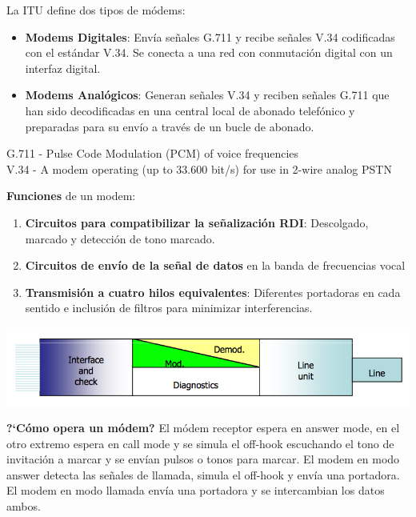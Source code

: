 \documentclass[10pt,portrait, twocolumn]{article}
\makeatletter
\renewcommand{\subsubsection}{\@startsection{subsubsection}{3}{0mm}%
                                {-1ex plus -.5ex minus -.2ex}%
                                {1ex plus .2ex}%
                                {\normalfont\small\bfseries}}
\makeatother
\begin{document}
La ITU define dos tipos de módems:

\begin{itemize}
	\item \textbf{Modems Digitales}: Envía señales G.711 y recibe señales V.34 codificadas con el estándar V.34. Se conecta a una red con conmutación digital con un interfaz digital.
	\item \textbf{Modems Analógicos}: Generan señales V.34 y reciben señales G.711 que han sido decodificadas en una central local de abonado telefónico y preparadas para su envío a través de un bucle de abonado.
\end{itemize}

\begin{center}
	{\scriptsize G.711 - Pulse Code Modulation (PCM) of voice frequencies\\
	V.34 - A modem operating (up to 33.600 bit/s) for use in 2-wire analog PSTN}
\end{center}

\textbf{Funciones} de un modem:

	\begin{enumerate}
		\item \textbf{Circuitos para compatibilizar la señalización RDI}: Descolgado, marcado y detección de tono marcado.
		\item \textbf{Circuitos de envío de la señal de datos} en la banda de frecuencias vocal
		\item \textbf{Transmisión a cuatro hilos equivalentes}: Diferentes portadoras en cada sentido e inclusión de filtros para minimizar interferencias.
	\end{enumerate}
	
	\begin{center}
		\includegraphics[scale=0.3]{images/FuncModem}
	\end{center}
	

\textbf{?`Cómo opera un módem?} El módem receptor espera en answer mode, en el otro extremo espera en call mode y se simula el off-hook escuchando el tono de invitación a marcar y se envían pulsos o tonos para marcar. El modem en modo answer detecta las señales de llamada, simula el off-hook y envía una portadora. El modem en modo llamada envía una portadora y se intercambian los datos ambos.
\end{document}
